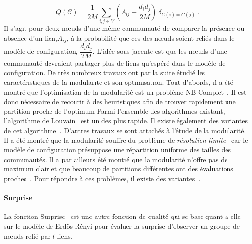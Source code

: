 \begin{equation}
Q(\mathcal{C}) = \dfrac{1}{2M}\sum_{i,j \in V} \left(A_{ij} - \dfrac{d_id_j}{2M}\right)\ \delta_{C(i)=C(j)} \ .
\end{equation}
Il s'agit pour deux n\oe uds d'une même communauté de comparer la présence ou absence d'un lien,$A_{ij}$, à la probabilité que ces des n\oe uds soient reliés dans le modèle de configuration, $\dfrac{d_id_j}{2M}$.
L'idée sous-jacente est que les n\oe uds d'une communauté devraient partager plus de liens qu'espéré dans le modèle de configuration.
De très nombreux travaux ont par la suite étudié les caractéristiques de la modularité et son optimisation.
Tout d'abords, il a été montré que l'optimisation de la modularité est un problème NB-Complet~\cite{Brandes2007}.
Il est donc nécessaire de recourir à des heuristiques afin de trouver rapidement une partition proche de l'optimum
Parmi l'ensemble des algorithmes existant, l'algorithme de Louvain~\cite{Blondel2008a} est un des plus rapide.
Il existe également des variantes de cet algorithme~\cite{Huang2015,Traag2015a}.
D'autres travaux se sont attachés à l'étude de la modularité.
Il a été montré que la modularité souffre du problème de \emph{résolution limite}~\cite{Fortunato2007,Lancichinetti2011} car le modèle de configuration présuppose une répartition uniforme des tailles des communautés.
Il a par ailleurs été montré que la modularité n'offre pas de maximum clair et que beaucoup de partitions différentes ont des évaluations proches~\cite{Good2010}.
Pour répondre à ces problèmes, il existe des variantes~\cite{Reichardt2006,Delvenne2010}.

\paragraph{Surprise}
La fonction Surprise~\cite{Aldecoa2011,Traag2015b} est une autre fonction de qualité qui se base quant a elle sur le modèle de Erdös-Rényi pour évaluer la surprise d'observer un groupe de n\oe uds relié par $l$ liens.

